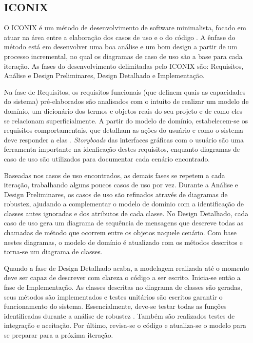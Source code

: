 \documentclass[
	12pt,				%
	openright,			%
	oneside,			%
	a4paper,			%
	english,			%
	spanish,			%
	brazil				%
	]{abntex2}
\begin{document}
	\subsection{ICONIX}	
	
	O ICONIX é um método de desenvolvimento de software minimalista, focado em atuar na área entre a elaboração dos casos de uso e o do código \cite{iconix}. A ênfase do método está em desenvolver uma boa análise e um bom design a partir de um processo incremental, no qual os diagramas de caso de uso são a base para cada iteração. As fases do desenvolvimento delimitadas pelo ICONIX são: Requisitos, Análise e Design Preliminares, Design Detalhado e Implementação.
	
	Na fase de Requisitos, os requisitos funcionais (que definem quais as capacidades do sistema) pré-elaborados são analisados com o intuito de realizar um modelo de domínio, um dicionário dos termos e objetos reais do seu projeto e de como eles se relacionam superficialmente. A partir do modelo de domínio, estabelecem-se os requisitos comportamentais, que detalham as ações do usuário e como o sistema deve responder a elas \cite{iconix}. \emph{Storyboads} das interfaces gráficas com o usuário são uma ferramenta importante na idenficação destes requisitos, enquanto diagramas de caso de uso são utilizados para documentar cada cenário encontrado.
	
	Baseadas nos casos de uso encontrados, as demais fases se repetem a cada iteração, trabalhando alguns poucos casos de uso por vez. Durante a Análise e Design Preliminares, os casos de uso são refinados através de diagramas de robustez, ajudando a complementar o modelo de domínio com a identificação de classes antes ignoradas e dos atributos de cada classe. No Design Detalhado, cada caso de uso gera um diagrama de sequência de mensagens que descreve todas as chamadas de método que ocorrem entre os objetos naquele cenário. Com base nestes diagramas, o modelo de domínio é atualizado com os métodos descritos e torna-se um diagrama de classes.
	
	Quando a fase de Design Detalhado acaba, a modelagem realizada até o momento deve ser capaz de descrever com clareza o código a ser escrito. Inicia-se então a fase de Implementação. As classes descritas no diagrama de classes são geradas, seus métodos são implementados e testes unitários são escritos garantir o funcionamento do sistema. Essencialmente, deve-se testar todas as funções identificadas durante a análise de robustez \cite{iconix}. Também são realizados testes de integração e aceitação. Por último, revisa-se o código e atualiza-se o modelo para se preparar para a próxima iteração.  
	
\end{document}
